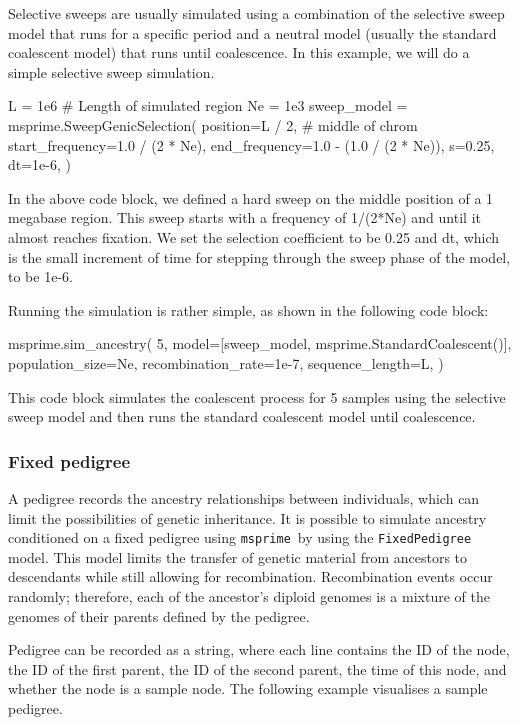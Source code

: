 \documentclass[graybox]{svmult}
\newcommand{\msprime}[0]{\texttt{msprime}}
\begin{document}
Selective sweeps are usually simulated using a combination of the selective sweep model that runs for a specific
period and a neutral model (usually the standard coalescent model) that runs until coalescence. In this example,
we will do a simple selective sweep simulation.

\begin{pythoncode}
L = 1e6  # Length of simulated region
Ne = 1e3
sweep_model = msprime.SweepGenicSelection(
    position=L / 2,  # middle of chrom
    start_frequency=1.0 / (2 * Ne),
    end_frequency=1.0 - (1.0 / (2 * Ne)),
    s=0.25,
    dt=1e-6,
)
\end{pythoncode}

In the above code block, we defined a hard sweep on the middle position of a 1 megabase region. This sweep starts with a frequency of 1/(2*Ne) and
until it almost reaches fixation. We set the selection coefficient to be 0.25 and dt, which is the small increment of time for stepping through the sweep
phase of the model, to be 1e-6.

Running the simulation is rather simple, as shown in the following code block:

\begin{pythoncode}
msprime.sim_ancestry(
    5,
    model=[sweep_model,
           msprime.StandardCoalescent()],
    population_size=Ne,
    recombination_rate=1e-7,
    sequence_length=L,
)
\end{pythoncode}

This code block simulates the coalescent process for 5 samples using the selective sweep model and then runs the standard coalescent model until
coalescence.

\subsubsection{Fixed pedigree}\label{fixed-pedigree}

A pedigree records the ancestry relationships between individuals, which can limit the possibilities of genetic inheritance. It is possible to
simulate ancestry conditioned on a fixed pedigree using \msprime\ by using the \texttt{FixedPedigree} model. This model limits the transfer of
genetic material from ancestors to descendants while still allowing for recombination. Recombination events occur randomly; therefore, each of
the ancestor's diploid genomes is a mixture of the genomes of their parents defined by the pedigree.

Pedigree can be recorded as a string, where each line contains the ID of the node, the ID of the first parent, the ID of the
second parent, the time of this node, and whether the node is a sample node. The following example visualises a sample pedigree.
\end{document}
